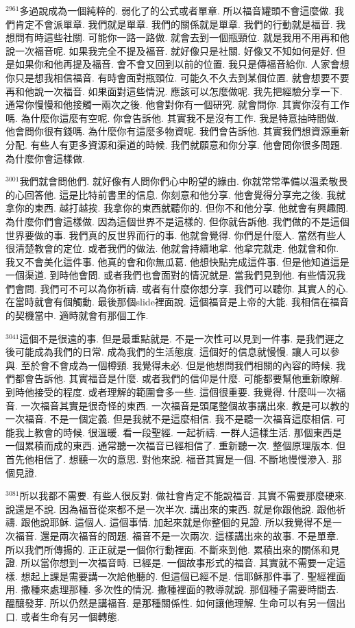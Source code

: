 \documentclass{book}
\begin{document}
$^{2961}$多過說成為一個純粹的.
弱化了的公式或者單章.
所以福音罐頭不會這麼做.
我們肯定不會派單章.
我們就是單章.
我們的關係就是單章.
我們的行動就是福音.
我想問有時這些社關.
可能你一路一路做.
就會去到一個瓶頸位.
就是我用不用再和他說一次福音呢.
如果我完全不提及福音.
就好像只是社關.
好像又不知如何是好.
但是如果你和他再提及福音.
會不會又回到以前的位置.
我只是傳福音給你.
人家會想你只是想我相信福音.
有時會面對瓶頸位.
可能久不久去到某個位置.
就會想要不要再和他說一次福音.
如果面對這些情況.
應該可以怎麼做呢.
我先把經驗分享一下.
通常你慢慢和他接觸一兩次之後.
他會對你有一個研究.
就會問你.
其實你沒有工作嗎.
為什麼你這麼有空呢.
你會告訴他.
其實我不是沒有工作.
我是特意抽時間做.
他會問你很有錢嗎.
為什麼你有這麼多物資呢.
我們會告訴他.
其實我們想資源重新分配.
有些人有更多資源和渠道的時候.
我們就願意和你分享.
他會問你很多問題.
為什麼你會這樣做.

$^{3001}$我們就會問他們.
就好像有人問你們心中盼望的緣由.
你就常常準備以溫柔敬畏的心回答他.
這是比特前書里的信息.
你刻意和他分享.
他會覺得分享完之後.
我就拿你的東西.
越打越挨.
我拿你的東西就聽你的.
但你不和他分享.
他就會有興趣問.
為什麼你們會這樣做.
因為這個世界不是這樣的.
但你就告訴他.
我們做的不是這個世界要做的事.
我們真的反世界而行的事.
他就會覺得.
你們是什麼人.
當然有些人很清楚教會的定位.
或者我們的做法.
他就會持續地拿.
他拿完就走.
他就會和你.
我又不會美化這件事.
他真的會和你無瓜葛.
他想快點完成這件事.
但是他知道這是一個渠道.
到時他會問.
或者我們也會面對的情況就是.
當我們見到他.
有些情況我們會問.
我們可不可以為你祈禱.
或者有什麼你想分享.
我們可以聽你.
其實人的心.
在當時就會有個觸動.
最後那個slide裡面說.
這個福音是上帝的大能.
我相信在福音的契機當中.
適時就會有那個工作.

$^{3041}$這個不是很遠的事.
但是最重點就是.
不是一次性可以見到一件事.
是我們遲之後可能成為我們的日常.
成為我們的生活態度.
這個好的信息就慢慢.
讓人可以參與.
至於會不會成為一個樽頸.
我覺得未必.
但是他想問我們相關的內容的時候.
我們都會告訴他.
其實福音是什麼.
或者我們的信仰是什麼.
可能都要幫他重新瞭解.
到時他接受的程度.
或者理解的範圍會多一些.
這個很重要.
我覺得.
什麼叫一次福音.
一次福音其實是很奇怪的東西.
一次福音是頭尾整個故事講出來.
教是可以教的一次福音.
不是一個定義.
但是我就不是這麼相信.
我不是聽一次福音這麼相信.
可能我上教會的時候.
很溫暖.
看一段聖經.
一起祈禱.
一群人這樣生活.
那個東西是一個累積而成的東西.
通常聽一次福音已經相信了.
重新聽一次.
整個原理版本.
但首先他相信了.
想聽一次的意思.
對他來說.
福音其實是一個.
不斷地慢慢滲入.
那個見證.

$^{3081}$所以我都不需要.
有些人很反對.
做社會肯定不能說福音.
其實不需要那麼硬來.
說還是不說.
因為福音從來都不是一次半次.
講出來的東西.
就是你跟他說.
跟他祈禱.
跟他說耶穌.
這個人.
這個事情.
加起來就是你整個的見證.
所以我覺得不是一次福音.
還是兩次福音的問題.
福音不是一次兩次.
這樣講出來的故事.
不是單章.
所以我們所傳揚的.
正正就是一個你行動裡面.
不斷來到他.
累積出來的關係和見證.
所以當你想到一次福音時.
已經是.
一個故事形式的福音.
其實就不需要一定這樣.
想起上課是需要講一次給他聽的.
但這個已經不是.
信耶穌那件事了.
聖經裡面用.
撒種來處理那種.
多次性的情況.
撒種裡面的教導就說.
那個種子需要時間去.
醞釀發芽.
所以仍然是講福音.
是那種關係性.
如何讓他理解.
生命可以有另一個出口.
或者生命有另一個轉態.
\end{document}
